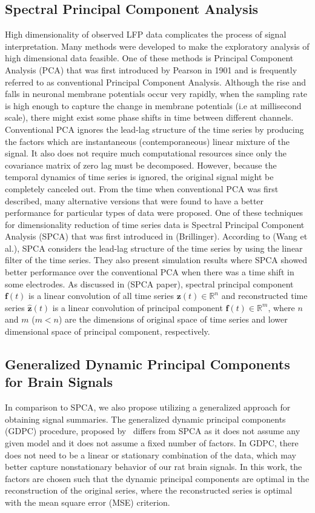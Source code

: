 \documentclass[12pt]{article}
\begin{document}
\subsection{Spectral Principal Component Analysis} \label{sec:spca}
High dimensionality of observed LFP data complicates the process of signal interpretation. Many methods were developed to make the exploratory analysis of high dimensional data feasible. One of these methods is Principal Component Analysis (PCA) that was first introduced by Pearson in 1901 and is frequently referred to as conventional Principal Component Analysis.  Although the rise and falls in neuronal membrane potentials occur very rapidly, when the sampling rate is high enough to capture the change in membrane potentials (i.e at millisecond scale), there might exist some phase shifts in time between different channels. Conventional PCA ignores the lead-lag structure of the time series by producing the factors which are instantaneous (contemporaneous) linear mixture of the signal. It also does not require much computational resources since only the covariance matrix of zero lag must be decomposed. However, because the temporal dynamics of time series is ignored, the original signal might be completely canceled out. From the time when conventional PCA was first described, many alternative versions that were found to have a better performance for particular types of data were proposed. One of these techniques for dimensionality reduction of time series data is Spectral Principal Component Analysis (SPCA) that was first introduced in (Brillinger). According to (Wang et al.), SPCA considers the lead-lag structure of the time series by using the linear filter of the time series. They also present simulation results where SPCA showed better performance over the conventional PCA when there was a time shift in some electrodes. As discussed in (SPCA paper), spectral principal component $\mathbf{f}(t)$ is a linear convolution of all time series $\mathbf{z}(t) \in \mathbb{R}^{n}$ and reconstructed time series $\mathbf{\hat{z}}(t)$ is a linear convolution of principal component $\mathbf{f}(t) \in \mathbb{R}^{m}$, where $\mathit{n}$ and $\mathit{m}$ ($\mathit{m<n}$) are the dimensions of original space of time series and lower dimensional space of principal component, respectively. 


\subsection{Generalized Dynamic Principal Components for Brain Signals} \label{sec:gdpc}
In comparison to SPCA, we also propose utilizing a generalized approach for obtaining signal summaries. The generalized dynamic principal components (GDPC) procedure, proposed by~\cite{pena} differs from SPCA as it does not assume any given model and it does not assume a fixed number of factors. In GDPC, there does not need to be a linear or stationary combination of the data, which may better capture nonstationary behavior of our rat brain signals. In this work, the factors are chosen such that the dynamic principal components are optimal in the reconstruction of the original series, where the reconstructed series is optimal with the mean square error (MSE) criterion.
\end{document}
